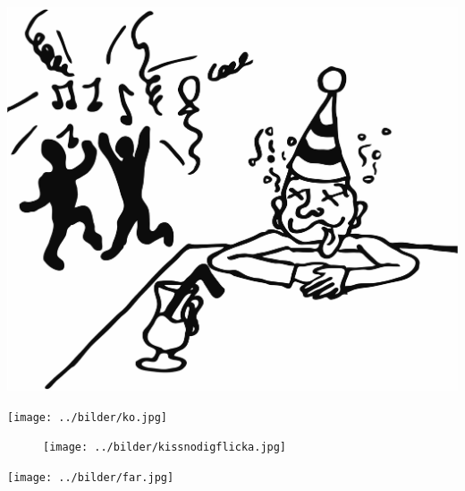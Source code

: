 \begin{intersong}
\sffamily\bfseries\LARGE{}
\begin{center}
\includegraphics[scale=.8]{../bilder/fardigabilder/BilderTillKapitel/jagvarfull.png} 
\end{center}
\end{intersong}
\ssclearpage

\begin{intersong}
\begin{center}
\texttt{[image: ../bilder/ko.jpg]} 
\end{center}
\end{intersong}
\ssclearpage


\ssclearpage

%
\sclearpage

\begin{figure}
\begin{center}
\texttt{[image: ../bilder/kissnodigflicka.jpg]} 
\end{center}
\end{figure}
\sclearpage

\begin{intersong}
\begin{center}
\texttt{[image: ../bilder/far.jpg]} 
\end{center}
\end{intersong}
\ssclearpage


\sclearpage

\ssclearpage

